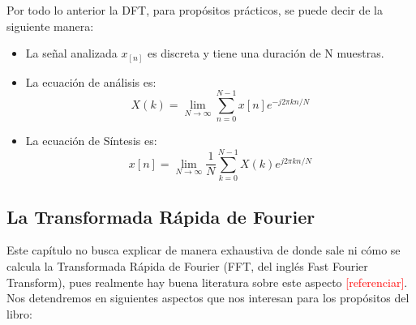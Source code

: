 Por todo lo anterior la DFT, para propósitos prácticos, se puede decir de la siguiente manera:
\begin{itemize}
	\item  La señal analizada $x_[n]$ es discreta y tiene una duración de N muestras.
	\item  La ecuación de análisis es:
\begin{equation} \label{equ_DFT2}
			 X(k) = \lim_{N \to \infty} \sum_{n=0}^{N-1}x[n]e^{-j2 \pi kn/N}		
\end{equation}	
\item  La ecuación de Síntesis es:
\begin{equation} \label{equ_DFTi2}
			 x[n] = \lim_{N \to \infty} \frac{1}{N} \sum_{k=0}^{N-1}X(k) e^{j2 \pi kn/N}
\end{equation}
\end{itemize}
\subsection{La Transformada Rápida de Fourier}
Este capítulo no busca explicar de manera exhaustiva de donde sale ni cómo se calcula la Transformada Rápida de Fourier (FFT, del inglés Fast Fourier Transform), pues realmente hay buena literatura sobre este aspecto \textcolor{red}{[referenciar]}.\\ Nos detendremos en siguientes aspectos que nos interesan para los propósitos del libro:

